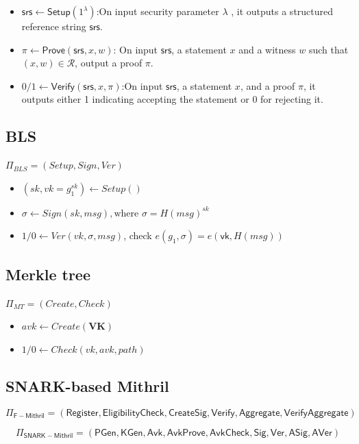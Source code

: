 \documentclass{article}
\begin{document}
\begin{itemize}
    \item $  \mathsf{srs} \leftarrow \mathsf{Setup}(1^\lambda)$:On input security parameter $\lambda$
, it outputs a structured reference string $\mathsf{srs}$.   
    \item $\pi \leftarrow \mathsf{Prove}(\mathsf{srs}, x, w)$: On input $\mathsf{srs}$, a statement $x$ and a witness $w$ such that $(x, w) \in \mathcal{R}$, output a proof $\pi$.
    \item $0/1 \leftarrow\mathsf{Verify}(\mathsf{srs},x,\pi) $:On input $\mathsf{srs}$, a statement $x$, and a
proof $\pi$, it outputs either 1 indicating accepting the statement or 0 for rejecting it.
\end{itemize}

\subsection{BLS}
$\Pi_{BLS} = (Setup,Sign,Ver)$
\begin{itemize}
    \item $(sk,vk = g_1^{sk}) \leftarrow Setup() $
    \item $\sigma \leftarrow Sign(sk,msg), \text{where  }\sigma = H(msg)^{sk}$
    \item $1/0 \leftarrow Ver(vk,\sigma,msg)$, check $e(g_1, \sigma) = e(\mathsf{vk}, H(msg))$
\end{itemize}

\subsection{Merkle tree}

$\Pi_{MT} = (Create,Check)$

\begin{itemize}
    \item $avk \leftarrow Create(\mathbf{VK})$
    \item $1/0 \leftarrow Check(vk,avk,path)$
\end{itemize}

\subsection{SNARK-based Mithril}


\[
\Pi_{\mathsf{F-Mithril}}
= (\mathsf{Register},
   \mathsf{EligibilityCheck}, \mathsf{CreateSig}, \mathsf{Verify},
   \mathsf{Aggregate}, \mathsf{VerifyAggregate})
\]

\[
\Pi_{\mathsf{SNARK-Mithril}}
= (\mathsf{PGen}, \mathsf{KGen}, \mathsf{Avk},
   \mathsf{AvkProve},
   \mathsf{AvkCheck}, \mathsf{Sig}, \mathsf{Ver},
   \mathsf{ASig}, \mathsf{AVer})
\]
\end{document}
